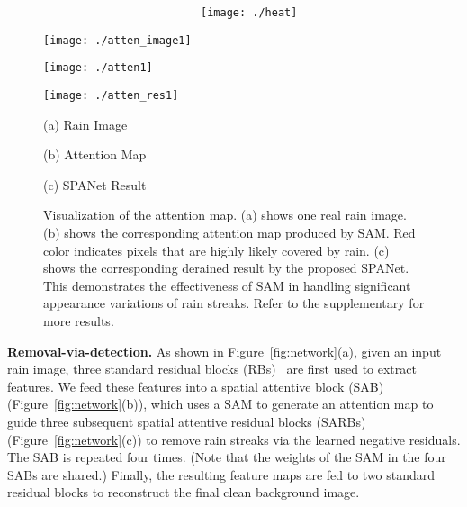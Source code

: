 \documentclass[10pt,twocolumn,letterpaper]{article}
\begin{document}
\begin{figure}[h]
\begin{minipage}[t]{\linewidth}
\ \ \ \ \ \ \ \ \ \ \ \ \ \ \ \ \ \ \ \ \ \ \ \ \ \texttt{[image: ./heat]}
\vspace{1mm}
\end{minipage}
\centering
\begin{minipage}[t]{0.32\linewidth}
\centering
\texttt{[image: ./atten\_image1]}
\end{minipage}
\centering
\begin{minipage}[t]{0.32\linewidth}
\centering
\texttt{[image: ./atten1]}
\end{minipage}
\begin{minipage}[t]{0.32\linewidth}
\centering
\texttt{[image: ./atten\_res1]}
\vspace{-1mm}
\end{minipage}
\centering
\begin{minipage}[t]{0.32\linewidth}
\centering
\centerline{\footnotesize (a) Rain Image}
\end{minipage}
\centering
\begin{minipage}[t]{0.32\linewidth}
\centering
\centerline{\footnotesize (b) Attention Map}
\end{minipage}
\begin{minipage}[t]{0.32\linewidth}
\centering
\centerline{\footnotesize (c) SPANet Result}
\vspace{0.1mm}
\end{minipage}


\vspace{0mm}
\caption{Visualization of the attention map. (a) shows one real rain image. (b) shows the corresponding attention map produced by SAM. Red color indicates pixels that are highly likely covered by rain. (c) shows the corresponding derained result by the proposed SPANet. This demonstrates the effectiveness of SAM in handling significant appearance variations of rain streaks. Refer to the supplementary for more results.}
\label{fig:att}
\vspace{-3mm}
\end{figure}


{\bf Removal-via-detection.}  As shown in Figure~\ref{fig:network}(a), given an input rain image, three standard residual blocks (RBs)~\cite{he:cvpr:2016:resnet} are first used to extract features. We feed these features into a spatial attentive block (SAB) (Figure~\ref{fig:network}(b)), which uses a SAM to generate an attention map to guide three subsequent spatial attentive residual blocks (SARBs) (Figure~\ref{fig:network}(c)) to remove rain streaks via the learned negative residuals. The SAB is repeated four times. (Note that the weights of the SAM in the four SABs are shared.) Finally, the resulting feature maps are fed to two standard residual blocks to reconstruct the final clean background image.
\end{document}
